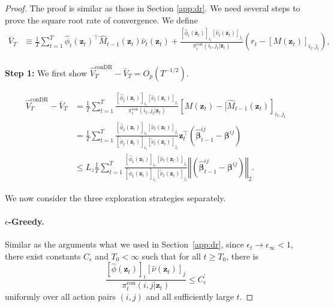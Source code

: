 \documentclass[12pt]{article}
\begin{document}
\begin{proof}

The proof is similar as those in Section \ref{app:dr}. We need several steps to prove the square root rate of convergence. We define 
\begin{align*}
    \bar{V}_T &\equiv \frac{1}{T}\sum_{t=1}^T \widehat{\phi}_t(\bm{z}_t)^\top \widehat{M}_{t-1}(\bm{z}_t)\widehat{\nu}_t(\bm{z}_t) + \frac{[\widehat{\phi}_t(\bm{z}_t)]_{i_t}[\widehat{\nu}_t(\bm{z}_t)]_{j_t}}{{\pi}_t^{\mathrm{con}}(i_t,j_t \vert \bm{z}_t)}(r_t - [M(\bm{z}_t)]_{i_t,j_t}), \\
\end{align*}

\textbf{Step 1:} We first show $\widehat{V}_T^\text{conDR} - \bar{V}_T = O_p(T^{-1/2})$.

\begin{align*} 
       \widehat{V}_T^\text{conDR} - \bar{V}_T &= \frac{1}{T}\sum_{t=1}^T \frac{[\widehat{\phi}_t(\bm{z}_t)]_{i_t}[\widehat{\nu}_t(\bm{z}_t)]_{j_t}}{{\pi}_t^{\mathrm{con}}(i_t,j_t \vert \bm{z}_t)} \left[M(\bm{z}_t) - [\widehat{M}_{t-1}(\bm{z}_t)\right]_{i_t,j_t} \\
    &= \frac{1}{T}\sum_{t=1}^T \frac{[\widehat{\phi}_t(\bm{z}_t)]_{i_t}[\widehat{\nu}_t(\bm{z}_t)]_{j_t}}{[\widetilde{\phi}_t(\bm{z}_t)]_{i_t}[\widetilde{\nu}_t(\bm{z}_t)]_{j_t}} \bm{z}_t^\top \left(\widehat{\bm{\beta}}_{t-1}^{ij}-\bm{\beta}^{ij}  \right) \\
    &\le L_z \frac{1}{T}\sum_{t=1}^T \frac{[\widehat{\phi}_t(\bm{z}_t)]_{i_t}[\widehat{\nu}_t(\bm{z}_t)]_{j_t}}{[\widetilde{\phi}_t(\bm{z}_t)]_{i_t}[\widetilde{\nu}_t(\bm{z}_t)]_{j_t}} \left\Vert \left(\widehat{\bm{\beta}}_{t-1}^{ij}-\bm{\beta}^{ij} \right) \right\Vert_2.
\end{align*}

We now consider the three exploration strategies separately. 
\paragraph{$\epsilon$-Greedy.}
Similar as the arguments what we used in Section~\ref{app:dr}, since $\epsilon_t\to\epsilon_\infty<1$, there exist constants $C_\epsilon$ and $T_0<\infty$ such that for all $t\ge T_0$, there is
\[
\frac{
[\widehat{\phi}(\bm z_t)]_i
[\widehat{\nu}(\bm z_t)]_j
}{\pi_t^\mathrm{con}(i,j | \bm z_t)
}
\le C_\epsilon^\prime
\]
uniformly over all action pairs $(i,j)$ and all sufficiently large $t$.


\end{proof}
\end{document}
